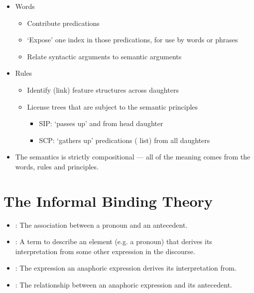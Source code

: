 \documentclass[a4paper,landscape,headrule,footrule]{foils}
\begin{document}
\MyLogo{}
\begin{itemize}
\item Words
  \begin{itemize}
  \item Contribute predications
  \item ‘Expose’ one index in those predications, for use by words or phrases
  \item Relate syntactic arguments to semantic arguments
  \end{itemize}
\item Rules
\begin{itemize}
\item Identify (link) feature structures across daughters
\item License trees that are subject to the semantic principles
  \begin{itemize}
  \item SIP: ‘passes up’  and  from head daughter
  \item SCP: ‘gathers up’ predications ( list) from all daughters
  \end{itemize}
\end{itemize}
\item The semantics is strictly compositional --- all of the meaning
  comes from the words, rules and principles.
\end{itemize}

\section[The informal binding theory from Chapter 1]{The Informal Binding Theory}



\begin{exe}
\ix {}
\ix {}
\ix {}
\ix {}
\ix {}
\ix {}
\ix {}
\ix {}
\ix {}
\ix {}
\end{exe}

\begin{itemize}
\item {}: The association between a pronoun
and an antecedent.
\item {}: A term to describe an element (e.g.
a pronoun) that derives its interpretation from
some other expression in the discourse.
\item {}: The expression an anaphoric
expression derives its interpretation from.
\item {}: The relationship between an
anaphoric expression and its antecedent.
\end{itemize}
\end{document}
